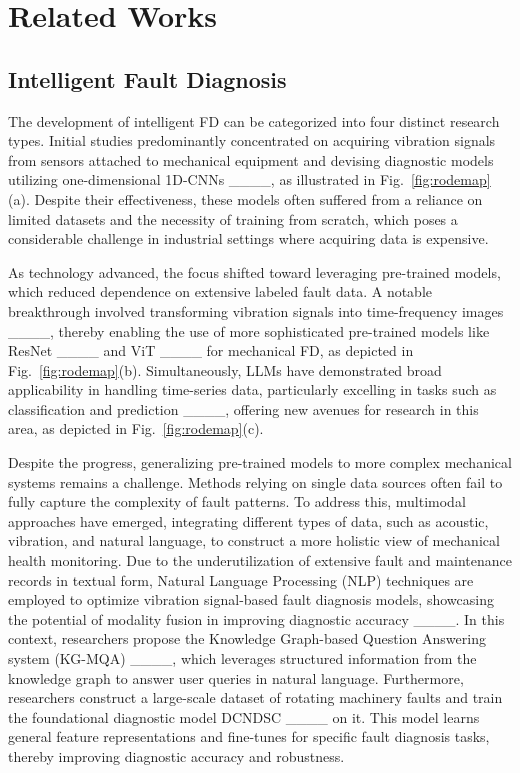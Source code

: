 \section{Related Works}
\label{sec:related_works}

\subsection{Intelligent Fault Diagnosis}
The development of intelligent FD can be categorized into four distinct research types.
Initial studies predominantly concentrated on acquiring vibration signals from sensors attached to mechanical equipment and devising diagnostic models utilizing one-dimensional 1D-CNNs ____, as illustrated in Fig.~\ref{fig:rodemap}(a). 
Despite their effectiveness, these models often suffered from a reliance on limited datasets and the necessity of training from scratch, which poses a considerable challenge in industrial settings where acquiring data is expensive.

As technology advanced, the focus shifted toward leveraging pre-trained models, which reduced dependence on extensive labeled fault data. A notable breakthrough involved transforming vibration signals into time-frequency images ____, thereby enabling the use of more sophisticated pre-trained models like ResNet ____ and ViT ____ for mechanical FD, as depicted in Fig.~\ref{fig:rodemap}(b).
Simultaneously, LLMs have demonstrated broad applicability in handling time-series data, particularly excelling in tasks such as classification and prediction ____, offering new avenues for research in this area, as depicted in Fig.~\ref{fig:rodemap}(c).

Despite the progress, generalizing pre-trained models to more complex mechanical systems remains a challenge. Methods relying on single data sources often fail to fully capture the complexity of fault patterns. To address this, multimodal approaches have emerged, integrating different types of data, such as acoustic, vibration, and natural language, to construct a more holistic view of mechanical health monitoring. 
Due to the underutilization of extensive fault and maintenance records in textual form, Natural Language Processing (NLP) techniques are employed to optimize vibration signal-based fault diagnosis models, showcasing the potential of modality fusion in improving diagnostic accuracy ____. In this context, researchers propose the Knowledge Graph-based Question Answering system (KG-MQA) ____, which leverages structured information from the knowledge graph to answer user queries in natural language. Furthermore, researchers construct a large-scale dataset of rotating machinery faults and train the foundational diagnostic model DCNDSC ____ on it. This model learns general feature representations and fine-tunes for specific fault diagnosis tasks, thereby improving diagnostic accuracy and robustness.

